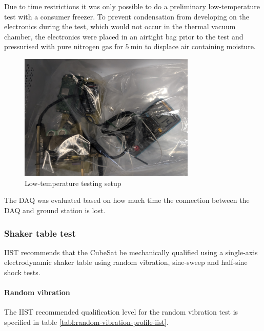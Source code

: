 \documentclass[a4paper,11pt]{article}
\begin{document}
Due to time restrictions it was only possible to do a preliminary low-temperature test with a consumer freezer. To prevent condensation from developing on the electronics during the test, which would not occur in the thermal vacuum chamber, the electronics were placed in an airtight bag prior to the test and pressurised with pure nitrogen gas for $\SI{5}{\minute}$ to displace air containing moisture.

\begin{figure}[H]
  \centering
  \includegraphics[width=0.75\textwidth]{images/fridge_test.jpg}
  \caption{Low-temperature testing setup}
  \label{fig:temperature-testing-fridge}
\end{figure}

The DAQ was evaluated based on how much time the connection between the DAQ and ground station is lost.

\subsubsection{Shaker table test}  \label{sec:shaker-table-test}

IIST recommends that the CubeSat be mechanically qualified using a single-axis electrodynamic shaker table using random vibration, sine-sweep and half-sine shock tests.

\paragraph{Random vibration}

The IIST recommended qualification level for the random vibration test is specified in table \ref{tabl:random-vibration-profile-iist}.
\end{document}
